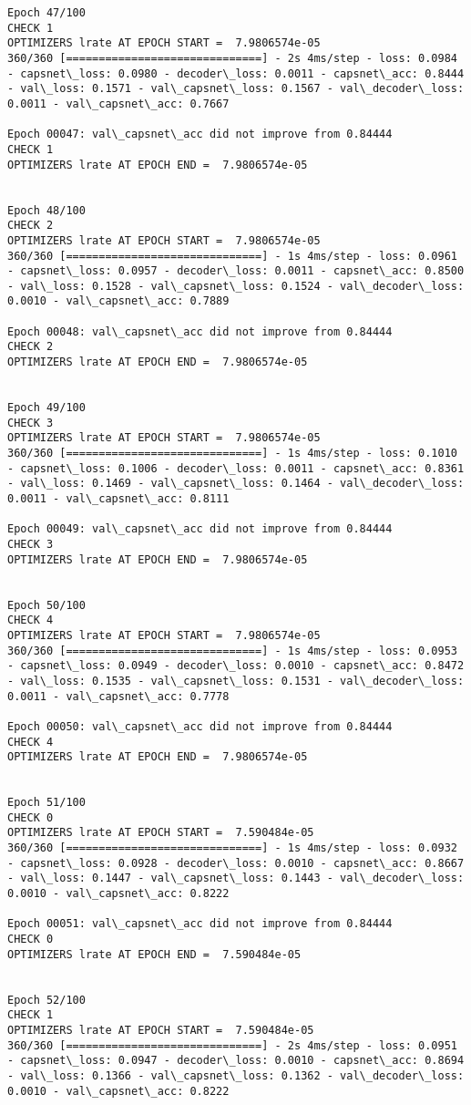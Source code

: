 \documentclass[11pt]{article}
\begin{document}
\begin{Verbatim}[commandchars=\\\{\}]
Epoch 47/100
CHECK 1
OPTIMIZERS lrate AT EPOCH START =  7.9806574e-05
360/360 [==============================] - 2s 4ms/step - loss: 0.0984 - capsnet\_loss: 0.0980 - decoder\_loss: 0.0011 - capsnet\_acc: 0.8444 - val\_loss: 0.1571 - val\_capsnet\_loss: 0.1567 - val\_decoder\_loss: 0.0011 - val\_capsnet\_acc: 0.7667

Epoch 00047: val\_capsnet\_acc did not improve from 0.84444
CHECK 1
OPTIMIZERS lrate AT EPOCH END =  7.9806574e-05 


Epoch 48/100
CHECK 2
OPTIMIZERS lrate AT EPOCH START =  7.9806574e-05
360/360 [==============================] - 1s 4ms/step - loss: 0.0961 - capsnet\_loss: 0.0957 - decoder\_loss: 0.0011 - capsnet\_acc: 0.8500 - val\_loss: 0.1528 - val\_capsnet\_loss: 0.1524 - val\_decoder\_loss: 0.0010 - val\_capsnet\_acc: 0.7889

Epoch 00048: val\_capsnet\_acc did not improve from 0.84444
CHECK 2
OPTIMIZERS lrate AT EPOCH END =  7.9806574e-05 


Epoch 49/100
CHECK 3
OPTIMIZERS lrate AT EPOCH START =  7.9806574e-05
360/360 [==============================] - 1s 4ms/step - loss: 0.1010 - capsnet\_loss: 0.1006 - decoder\_loss: 0.0011 - capsnet\_acc: 0.8361 - val\_loss: 0.1469 - val\_capsnet\_loss: 0.1464 - val\_decoder\_loss: 0.0011 - val\_capsnet\_acc: 0.8111

Epoch 00049: val\_capsnet\_acc did not improve from 0.84444
CHECK 3
OPTIMIZERS lrate AT EPOCH END =  7.9806574e-05 


Epoch 50/100
CHECK 4
OPTIMIZERS lrate AT EPOCH START =  7.9806574e-05
360/360 [==============================] - 1s 4ms/step - loss: 0.0953 - capsnet\_loss: 0.0949 - decoder\_loss: 0.0010 - capsnet\_acc: 0.8472 - val\_loss: 0.1535 - val\_capsnet\_loss: 0.1531 - val\_decoder\_loss: 0.0011 - val\_capsnet\_acc: 0.7778

Epoch 00050: val\_capsnet\_acc did not improve from 0.84444
CHECK 4
OPTIMIZERS lrate AT EPOCH END =  7.9806574e-05 


Epoch 51/100
CHECK 0
OPTIMIZERS lrate AT EPOCH START =  7.590484e-05
360/360 [==============================] - 1s 4ms/step - loss: 0.0932 - capsnet\_loss: 0.0928 - decoder\_loss: 0.0010 - capsnet\_acc: 0.8667 - val\_loss: 0.1447 - val\_capsnet\_loss: 0.1443 - val\_decoder\_loss: 0.0010 - val\_capsnet\_acc: 0.8222

Epoch 00051: val\_capsnet\_acc did not improve from 0.84444
CHECK 0
OPTIMIZERS lrate AT EPOCH END =  7.590484e-05 


Epoch 52/100
CHECK 1
OPTIMIZERS lrate AT EPOCH START =  7.590484e-05
360/360 [==============================] - 2s 4ms/step - loss: 0.0951 - capsnet\_loss: 0.0947 - decoder\_loss: 0.0010 - capsnet\_acc: 0.8694 - val\_loss: 0.1366 - val\_capsnet\_loss: 0.1362 - val\_decoder\_loss: 0.0010 - val\_capsnet\_acc: 0.8222


\end{Verbatim}
\end{document}
